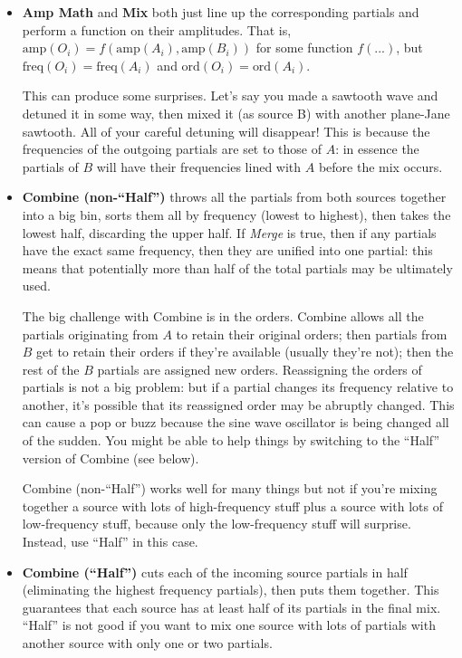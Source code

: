 \documentclass{article}
\begin{document}
\begin{itemize}
\item {\bf Amp Math} and {\bf Mix} both just line up the corresponding partials and perform a function on their amplitudes.  That is, \(\text{amp}(O_i) = f(\text{amp}(A_i), \text{amp}(B_i))\) for some function \(f(...)\), but \(\text{freq}(O_i) = \text{freq}(A_i)\) and  \(\text{ord}(O_i) = \text{ord}(A_i)\).  

This can produce some surprises.  Let's say you made a sawtooth wave and detuned it in some way, then mixed it (as source B) with another plane-Jane sawtooth.  All of your careful detuning will disappear!  This is because the frequencies of the outgoing partials are set to those of \(A\): in essence the partials of \(B\) will have their frequencies lined with \(A\) before the mix occurs.

\item {\bf Combine (non-``Half'')} throws all the partials from both sources together into a big bin, sorts them all by frequency (lowest to highest), then takes the lowest half, discarding the upper half.  If {\it Merge} is true, then if any partials have the exact same frequency, then they are unified into one partial: this means that potentially more than half of the total partials may be ultimately used.  

The big challenge with Combine is in the orders.  Combine allows all the partials originating from \(A\) to retain their original orders; then partials from \(B\) get to retain their orders if they're available (usually they're not); then the rest of the \(B\) partials are assigned new orders.  Reassigning the orders of partials is not a big problem: but if a partial changes its frequency relative to another, it's possible that its reassigned order may be abruptly changed.  This can cause a pop or buzz because the sine wave oscillator is being changed all of the sudden.  You might be able to help things by switching to the ``Half'' version of Combine (see below).

Combine (non-``Half'') works well for many things but not if you're mixing together a source with lots of high-frequency stuff plus a source with lots of low-frequency stuff, because only the low-frequency stuff will surprise.  Instead, use ``Half'' in this case. 

\item {\bf Combine (``Half'')} cuts each of the incoming source partials in half (eliminating the highest frequency partials), then puts them together. This guarantees that each source has at least half of its partials in the final mix.  ``Half'' is not good if you want to mix one source with lots of partials with another source with only one or two partials.


\end{itemize}
\end{document}
